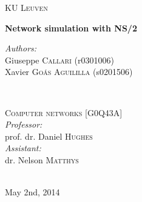 \begin{titlepage}
\thispagestyle{empty}
\newcommand{\HRule}{\rule{\linewidth}{0.5mm}}
\center
\textsc{\LARGE KU Leuven}\\[1.5cm]
\vfill

{ \Huge \bfseries Network simulation with NS/2}\\[0.4cm]
\vfill

\begin{minipage}{0.4\textwidth}
\begin{flushleft} \large
\emph{Authors:}\\
Giuseppe \textsc{Callari} (r0301006)\\
Xavier \textsc{Go\'as Aguililla} (s0201506)
\end{flushleft}
\end{minipage}
~
\begin{minipage}{0.4\textwidth}
\begin{flushright} \large
\textsc{\large Computer networks [G0Q43A]}\\[0.5cm]
\emph{Professor:} \\
prof. dr. Daniel \textsc{Hughes}\\
\emph{Assistant:} \\
dr. Nelson \textsc{Matthys}\\
\end{flushright}
\end{minipage}\\[4cm]

{\large May 2nd, 2014}\\[3cm]
\vfill

\end{titlepage}
